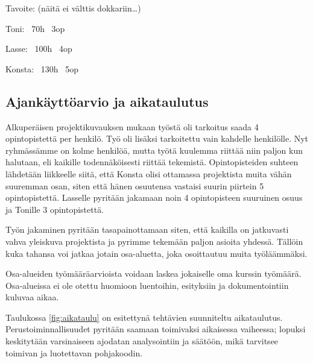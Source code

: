 \documentclass{article}
\begin{document}
Tavoite: (näitä ei välttis dokkariin…)

Toni: ~70h ~3op

Lasse: ~100h ~4op

Konsta: ~130h ~5op

\subsection{Ajankäyttöarvio ja aikataulutus}

Alkuperäisen projektikuvauksen mukaan työstä oli tarkoitus saada 4 opintopistettä per henkilö. Työ oli lisäksi tarkoitettu vain kahdelle henkilölle. Nyt ryhmässämme on kolme henkilöä, mutta työtä kuulemma riittää niin paljon kun halutaan, eli kaikille todennäköisesti riittää tekemistä. Opintopisteiden suhteen lähdetään liikkeelle siitä, että Konsta olisi ottamassa projektista muita vähän suuremman osan, siten että hänen osuutensa vastaisi suurin piirtein 5 opintopistettä. Lasselle pyritään jakamaan noin 4 opintopisteen suuruinen osuus ja Tonille 3 opintopistettä.

Työn jakaminen pyritään tasapainottamaan siten, että kaikilla on jatkuvasti vahva yleiskuva projektista ja pyrimme tekemään paljon asioita yhdessä. Tällöin kuka tahansa voi jatkaa jotain osa-aluetta, joka osoittautuu muita työläämmäksi.

Osa-alueiden työmääräarvioista voidaan laskea jokaiselle oma kurssin työmäärä. Osa-alueissa ei ole otettu huomioon luentoihin, esityksiin ja dokumentointiin kuluvaa aikaa.

Taulukossa \ref{fig:aikataulu} on esitettynä tehtävien suunniteltu aikataulutus. Perustoiminnallisuudet pyritään saamaan toimivaksi aikaisessa vaiheessa; lopuksi keskitytään varsinaiseen ajodatan analysointiin ja säätöön, mikä tarvitsee toimivan ja luotettavan pohjakoodin.
\end{document}
